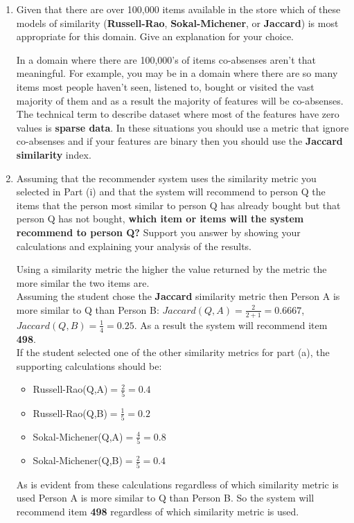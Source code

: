 \documentclass[--SOLUTION-OPTION--]{ditpaper}
\begin{document}
\begin{enumerate}
	\begin{enumerate}
			\item Given that there are over 100,000 items available in the store which of these models of similarity (\textbf{Russell-Rao}, \textbf{Sokal-Michener}, or \textbf{Jaccard}) is most appropriate for this domain. Give an explanation for your choice.
	\begin{answer}
In a domain where there are 100,000's of items co-absenses aren't that meaningful. For example, you may be in a domain where there are so many items most people haven't seen, listened to, bought or visited the vast majority of them and as a result the majority of features will be co-absenses. The technical term to describe dataset where most of the features have zero values is \textbf{sparse data}. In these situations you should use a metric that ignore co-absenses and if your features are binary then you should use the \textbf{Jaccard similarity} index. 
	\end{answer}
			\item Assuming that the recommender system uses the similarity metric you selected in Part (i) and that the system will recommend to person Q the items that the person most similar to person Q has already bought but that person Q has not bought, \textbf{which item or items will the system recommend to person Q?} Support you answer by showing your calculations and explaining your analysis of the results.
	\begin{answer}
		Using a similarity metric the higher the value returned by the metric the more similar the two items are.\\
		Assuming the student chose the \textbf{Jaccard} similarity metric then Person A is more similar to Q than Person B: $Jaccard(Q,A) = \frac{2}{2+1}= 0.6667$, $Jaccard(Q,B) = \frac{1}{4}= 0.25$. As a result the system will recommend item \textbf{498}.\\
		If the student selected one of the other similarity metrics for part (a), the supporting calculations should be:
\begin{itemize}
	\item Russell-Rao(Q,A)$=\frac{2}{5}= 0.4$
	\item Russell-Rao(Q,B)$=\frac{1}{5}= 0.2$
	\item Sokal-Michener(Q,A)$=\frac{4}{5}= 0.8$
	\item Sokal-Michener(Q,B)$=\frac{2}{5}= 0.4$	
\end{itemize}
		As is evident from these calculations regardless of which similarity metric is used Person A is more similar to Q than Person B. So the system will recommend item \textbf{498} regardless of which similarity metric is used.
	\end{answer}


\end{enumerate}
\end{enumerate}
\end{document}
